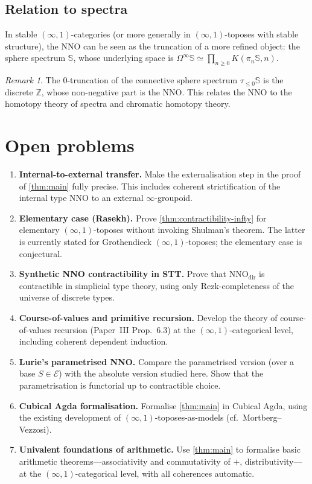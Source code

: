\documentclass[12pt]{article}
\theoremstyle{definition}
\theoremstyle{remark}
\newtheorem{remark}[theorem]{Remark}
\newcommand{\Z}{\mathbb{Z}}
\newcommand{\eqv}{\simeq}
\newcommand{\NNO}{\mathrm{NNO}}
\begin{document}
\subsection{Relation to spectra}

In stable $(\infty,1)$-categories (or more generally in $(\infty,1)$-toposes with stable structure), the NNO can be seen as the truncation of a more refined object: the sphere spectrum $\mathbb{S}$, whose underlying space is $\Omega^{\infty}\mathbb{S}\eqv \prod_{n\geq 0}K(\pi_{n}\mathbb{S},n)$.

\begin{remark}
The $0$-truncation of the connective sphere spectrum $\tau_{\leq 0}\mathbb{S}$ is the discrete $\Z$, whose non-negative part is the NNO\@. This relates the NNO to the homotopy theory of spectra and chromatic homotopy theory.
\end{remark}

\section{Open problems}\label{sec:open}

\begin{enumerate}
  \item \textbf{Internal-to-external transfer.}
  Make the externalisation step in the proof of \cref{thm:main} fully precise. This includes coherent strictification of the internal type $\NNO$ to an external $\infty$-groupoid.
  \item \textbf{Elementary case (Rasekh).}
  Prove \cref{thm:contractibility-infty} for elementary $(\infty,1)$-toposes without invoking Shulman's theorem. The latter is currently stated for Grothendieck $(\infty,1)$-toposes; the elementary case is conjectural.
  \item \textbf{Synthetic NNO contractibility in STT\@.}
  Prove that $\NNO_{\mathrm{dir}}$ is contractible in simplicial type theory, using only Rezk-completeness of the universe of discrete types.
  \item \textbf{Course-of-values and primitive recursion.}
  Develop the theory of course-of-values recursion (Paper~III Prop.~6.3) at the $(\infty,1)$-categorical level, including coherent dependent induction.
  \item \textbf{Lurie's parametrised NNO\@.}
  Compare the parametrised version (over a base $S\in\mathcal{E}$) with the absolute version studied here. Show that the parametrisation is functorial up to contractible choice.
  \item \textbf{Cubical Agda formalisation.}
  Formalise \cref{thm:main} in Cubical Agda, using the existing development of $(\infty,1)$-toposes-as-models (cf.\ Mortberg--Vezzosi).
  \item \textbf{Univalent foundations of arithmetic.}
  Use \cref{thm:main} to formalise basic arithmetic theorems---associativity and commutativity of $+$, distributivity---at the $(\infty,1)$-categorical level, with all coherences automatic.
\end{enumerate}
\end{document}
